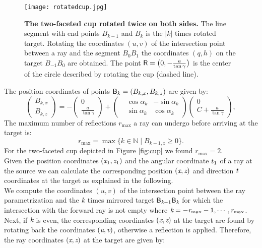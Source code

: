 \begin{figure}[t]%
 \begin{center}
  \texttt{[image: rotatedcup.jpg]}
  \end{center}
 \caption{\textbf{The two-faceted cup rotated twice on both sides.} The line segment with end points $B_{k-1}$ and $B_{k}$ is the $|k|$ times rotated target. Rotating the coordinates $(u,v)$ of the intersection point between a ray and the segment $B_0B_1$ the coordinates $(q,h)$ on the target $B_{-1}B_{0}$ are obtained. The point $\textsf{R} = \big(0,-\frac{a}{\tan{\gamma}}\big)$ is the center of the circle described by rotating the cup (dashed line).}
  \label{fig:twofaced}
  \end{figure}
The position coordinates of points $\textsf{B}_k = (B_{k,x}, B_{k,z})$ are given by:
\begin{equation}
 \begin{pmatrix} B_{k,x}  \\  B_{k,z}\end{pmatrix}= -
  \begin{pmatrix} 0  \\  \frac{a}{\tan\gamma}\end{pmatrix}+
 \left(\begin{split}  & \cos\alpha_k  & -\sin\alpha_k \\  & \sin\alpha_k & \cos\alpha_k\end{split}\right)
 \begin{pmatrix}  0 \\  C+\frac{a}{\tan\gamma}\end{pmatrix},
\end{equation}
The maximum number of reflections $r_{\textrm{max}}$ a ray can undergo before arriving at the target is:
\begin{equation}
r_{\textrm{max}}=\max\{k\in\mathbb{N} \;| \; B_{k-1,z}\geq 0\}.
\end{equation}
For the two-faceted cup depicted in Figure \ref{fig:cup} we found $r_{\textrm{max}}=2$.\\ \indent 
Given the position coordinates $(\textit{x}_1, \textit{z}_1)$ and the angular coordinate $t_1$ of a ray at the source we can calculate the corresponding position $(\textit{x}, \textit{z})$ and direction $t$ coordinates at the target as explained in the following. \\ \indent We compute the coordinates $(u,v)$ of the intersection point between the ray parametrization and the $\textit{k}$ times mirrored target $\textsf{B}_{\textit{k}-1}\textsf{B}_{\textit{k}}$ for which the intersection with the forward ray is not empty where $\textit{k}=-\textit{r}_{\textrm{max}}-1, \cdots, \textit{r}_{\textrm{max}}$. Next, if $\textit{k}$ is even, the corresponding coordinates $(\textit{x},\textit{z})$ at the target are found by rotating back the coordinates $(\textit{u},\textit{v})$, otherwise a reflection is applied. Therefore, the ray coordinates $(\textit{x},\textit{z})$ at the target are given by:
